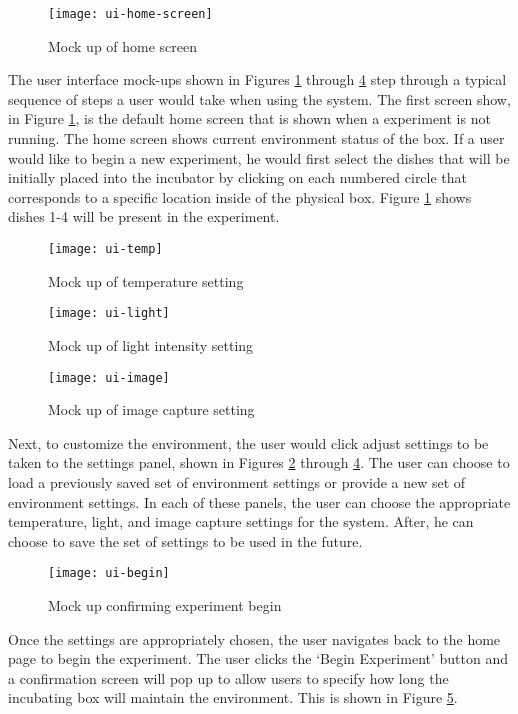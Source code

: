 \begin{figure}[H]
\texttt{[image: ui-home-screen]}
\caption{\label{figure:ui-home} Mock up of home screen}
\end{figure}

The user interface mock-ups shown in Figures \ref{figure:ui-home} through \ref{figure:ui-image} step through a typical sequence of steps a user would take when using the system. The first screen show, in Figure \ref{figure:ui-home}, is the default home screen that is shown when a experiment is not running. The home screen shows current environment status of the box. If a user would like to begin a new experiment, he would first select the dishes that will be initially placed into the incubator by clicking on each numbered circle that corresponds to a specific location inside of the physical box. Figure \ref{figure:ui-home} shows dishes 1-4 will be present in the experiment. 

\begin{figure}[H]
\texttt{[image: ui-temp]}
\caption{\label{figure:ui-temp} Mock up of temperature setting}

\end{figure}

\begin{figure}[H]
\texttt{[image: ui-light]}
\caption{\label{figure:ui-light} Mock up of light intensity setting}
\end{figure}

\begin{figure}[H]
\texttt{[image: ui-image]}
\caption{\label{figure:ui-image} Mock up of image capture setting}
\end{figure}


Next, to customize the environment, the user would click adjust settings to be taken to the settings panel, shown in Figures \ref{figure:ui-temp} through \ref{figure:ui-image}. The user can choose to load a previously saved set of environment settings or provide a new set of environment settings. In each of these panels, the user can choose the appropriate temperature, light, and image capture settings for the system. After, he can choose to save the set of settings to be used in the future. 

\begin{figure}[H]
\texttt{[image: ui-begin]}
\caption{\label{figure:ui-begin} Mock up confirming experiment begin }
\end{figure}


Once the settings are appropriately chosen, the user navigates back to the home page to begin the experiment. The user clicks the `Begin Experiment' button and a confirmation screen will pop up to allow users to specify how long the incubating box will maintain the environment. This is shown in Figure \ref{figure:ui-begin}.


